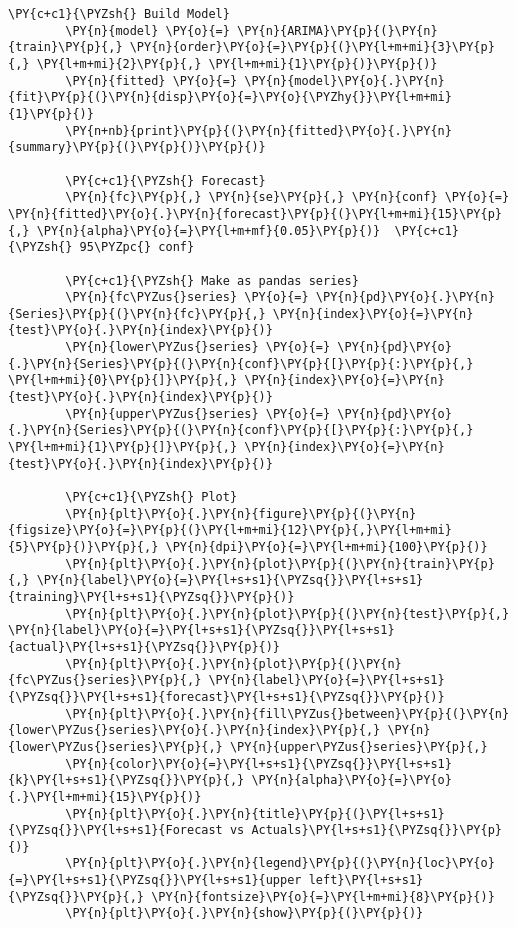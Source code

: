 \begin{codebox}[breakable, size=fbox, boxrule=1pt, pad at break*=1mm,colback=cellbackground, colframe=cellborder]
	\begin{Verbatim}[commandchars=\\\{\}]
		\PY{c+c1}{\PYZsh{} Build Model}
		\PY{n}{model} \PY{o}{=} \PY{n}{ARIMA}\PY{p}{(}\PY{n}{train}\PY{p}{,} \PY{n}{order}\PY{o}{=}\PY{p}{(}\PY{l+m+mi}{3}\PY{p}{,} \PY{l+m+mi}{2}\PY{p}{,} \PY{l+m+mi}{1}\PY{p}{)}\PY{p}{)}  
		\PY{n}{fitted} \PY{o}{=} \PY{n}{model}\PY{o}{.}\PY{n}{fit}\PY{p}{(}\PY{n}{disp}\PY{o}{=}\PY{o}{\PYZhy{}}\PY{l+m+mi}{1}\PY{p}{)}  
		\PY{n+nb}{print}\PY{p}{(}\PY{n}{fitted}\PY{o}{.}\PY{n}{summary}\PY{p}{(}\PY{p}{)}\PY{p}{)}
		
		\PY{c+c1}{\PYZsh{} Forecast}
		\PY{n}{fc}\PY{p}{,} \PY{n}{se}\PY{p}{,} \PY{n}{conf} \PY{o}{=} \PY{n}{fitted}\PY{o}{.}\PY{n}{forecast}\PY{p}{(}\PY{l+m+mi}{15}\PY{p}{,} \PY{n}{alpha}\PY{o}{=}\PY{l+m+mf}{0.05}\PY{p}{)}  \PY{c+c1}{\PYZsh{} 95\PYZpc{} conf}
		
		\PY{c+c1}{\PYZsh{} Make as pandas series}
		\PY{n}{fc\PYZus{}series} \PY{o}{=} \PY{n}{pd}\PY{o}{.}\PY{n}{Series}\PY{p}{(}\PY{n}{fc}\PY{p}{,} \PY{n}{index}\PY{o}{=}\PY{n}{test}\PY{o}{.}\PY{n}{index}\PY{p}{)}
		\PY{n}{lower\PYZus{}series} \PY{o}{=} \PY{n}{pd}\PY{o}{.}\PY{n}{Series}\PY{p}{(}\PY{n}{conf}\PY{p}{[}\PY{p}{:}\PY{p}{,} \PY{l+m+mi}{0}\PY{p}{]}\PY{p}{,} \PY{n}{index}\PY{o}{=}\PY{n}{test}\PY{o}{.}\PY{n}{index}\PY{p}{)}
		\PY{n}{upper\PYZus{}series} \PY{o}{=} \PY{n}{pd}\PY{o}{.}\PY{n}{Series}\PY{p}{(}\PY{n}{conf}\PY{p}{[}\PY{p}{:}\PY{p}{,} \PY{l+m+mi}{1}\PY{p}{]}\PY{p}{,} \PY{n}{index}\PY{o}{=}\PY{n}{test}\PY{o}{.}\PY{n}{index}\PY{p}{)}
		
		\PY{c+c1}{\PYZsh{} Plot}
		\PY{n}{plt}\PY{o}{.}\PY{n}{figure}\PY{p}{(}\PY{n}{figsize}\PY{o}{=}\PY{p}{(}\PY{l+m+mi}{12}\PY{p}{,}\PY{l+m+mi}{5}\PY{p}{)}\PY{p}{,} \PY{n}{dpi}\PY{o}{=}\PY{l+m+mi}{100}\PY{p}{)}
		\PY{n}{plt}\PY{o}{.}\PY{n}{plot}\PY{p}{(}\PY{n}{train}\PY{p}{,} \PY{n}{label}\PY{o}{=}\PY{l+s+s1}{\PYZsq{}}\PY{l+s+s1}{training}\PY{l+s+s1}{\PYZsq{}}\PY{p}{)}
		\PY{n}{plt}\PY{o}{.}\PY{n}{plot}\PY{p}{(}\PY{n}{test}\PY{p}{,} \PY{n}{label}\PY{o}{=}\PY{l+s+s1}{\PYZsq{}}\PY{l+s+s1}{actual}\PY{l+s+s1}{\PYZsq{}}\PY{p}{)}
		\PY{n}{plt}\PY{o}{.}\PY{n}{plot}\PY{p}{(}\PY{n}{fc\PYZus{}series}\PY{p}{,} \PY{n}{label}\PY{o}{=}\PY{l+s+s1}{\PYZsq{}}\PY{l+s+s1}{forecast}\PY{l+s+s1}{\PYZsq{}}\PY{p}{)}
		\PY{n}{plt}\PY{o}{.}\PY{n}{fill\PYZus{}between}\PY{p}{(}\PY{n}{lower\PYZus{}series}\PY{o}{.}\PY{n}{index}\PY{p}{,} \PY{n}{lower\PYZus{}series}\PY{p}{,} \PY{n}{upper\PYZus{}series}\PY{p}{,} 
		\PY{n}{color}\PY{o}{=}\PY{l+s+s1}{\PYZsq{}}\PY{l+s+s1}{k}\PY{l+s+s1}{\PYZsq{}}\PY{p}{,} \PY{n}{alpha}\PY{o}{=}\PY{o}{.}\PY{l+m+mi}{15}\PY{p}{)}
		\PY{n}{plt}\PY{o}{.}\PY{n}{title}\PY{p}{(}\PY{l+s+s1}{\PYZsq{}}\PY{l+s+s1}{Forecast vs Actuals}\PY{l+s+s1}{\PYZsq{}}\PY{p}{)}
		\PY{n}{plt}\PY{o}{.}\PY{n}{legend}\PY{p}{(}\PY{n}{loc}\PY{o}{=}\PY{l+s+s1}{\PYZsq{}}\PY{l+s+s1}{upper left}\PY{l+s+s1}{\PYZsq{}}\PY{p}{,} \PY{n}{fontsize}\PY{o}{=}\PY{l+m+mi}{8}\PY{p}{)}
		\PY{n}{plt}\PY{o}{.}\PY{n}{show}\PY{p}{(}\PY{p}{)}
\end{Verbatim}
\end{codebox}

